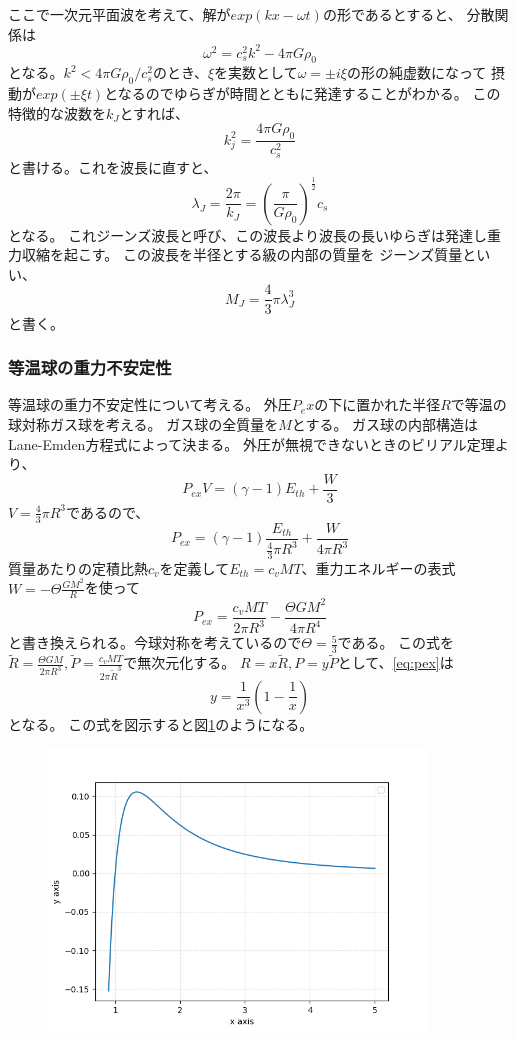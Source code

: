 \documentclass[a4j, dvipdfmx]{jsarticle}
\newcommand{\half}{\frac{1}{2}}
\newcommand{\ethe}{E_{th}}
\newcommand{\beq}{\begin{equation}}
\newcommand{\eeq}{\end{equation}}
\begin{document}
ここで一次元平面波を考えて、解が$exp(kx -\omega t)$の形であるとすると、
分散関係は
\beq
    \omega^2 = c_s^2k^2 - 4\pi G \rho_0
\eeq
となる。$k^2 < 4 \pi G\rho_0 / c_s^2$のとき、$\xi$を実数として$\omega = \pm i \xi$の形の純虚数になって
摂動が$exp(\pm \xi t)$となるのでゆらぎが時間とともに発達することがわかる。
この特徴的な波数を$k_J$とすれば、
\beq
k_j^2 = \frac{4\pi G \rho_0}{c_s^2}
\eeq
と書ける。これを波長に直すと、
\beq
\lambda_J = \frac{2\pi}{k_J} = \left(\frac{\pi}{G\rho_0} \right)^\half c_s
\eeq
となる。
これジーンズ波長と呼び、この波長より波長の長いゆらぎは発達し重力収縮を起こす。
この波長を半径とする級の内部の質量を
ジーンズ質量といい、
\beq
M_J = \frac{4}{3}\pi \lambda_J^3
\eeq
と書く。
\subsubsection{等温球の重力不安定性}
等温球の重力不安定性について考える。
外圧$P_ex$の下に置かれた半径$R$で等温の球対称ガス球を考える。
ガス球の全質量を$M$とする。
ガス球の内部構造はLane-Emden方程式によって決まる。
外圧が無視できないときのビリアル定理より、
\beq
P_{ex} V = (\gamma -1)\ethe + \frac{W}{3}
\eeq
$V = \frac{4}{3} \pi R^3$であるので、
\beq
P_{ex} = (\gamma -1)\frac{\ethe }{\frac{4}{3} \pi R^3}+ \frac{W}{4 \pi R^3}
\eeq
質量あたりの定積比熱$c_v$を定義して$\ethe = c_v MT$、重力エネルギーの表式$ W = - \Theta \frac{GM^2}{R}$を使って
\beq
P_{ex} = \frac{c_v MT}{2\pi R^3} - \frac{\Theta GM^2}{4\pi R^4}\label{eq:pex}
\eeq
と書き換えられる。今球対称を考えているので$\Theta = \frac{5}{3}$である。
この式を$\tilde{R} = \frac{\Theta G M}{2\pi R^3}, \tilde{P}=\frac{c_v MT}{2\pi \tilde{R}^3}$で無次元化する。
$R = x \tilde{R}, P = y \tilde{P}$として、\eqref{eq:pex}は
\beq
    y = \frac{1}{x^3} \left(1 - \frac{1}{x}\right)
\eeq
となる。
この式を図示すると図\ref{fig:spherical}のようになる。
\begin{figure}[H]
    \includegraphics[clip,width=10.0cm]{graph/spherical.png}
    \caption{}
    \label{fig:spherical}
\end{figure}
\end{document}
